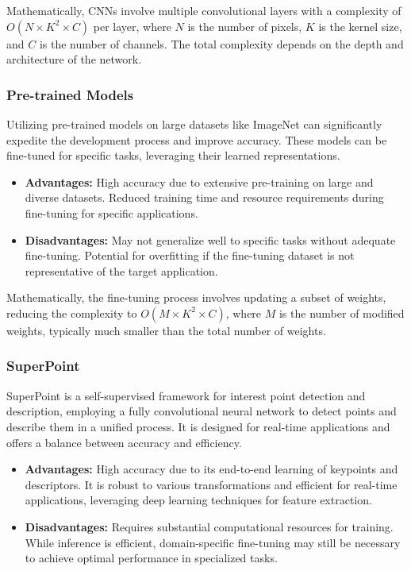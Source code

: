 Mathematically, CNNs involve multiple convolutional layers with a complexity of $O(N \times K^2 \times C)$ per layer, where $N$ is the number of pixels, $K$ is the kernel size, and $C$ is the number of channels. The total complexity depends on the depth and architecture of the network.

\subsubsection{Pre-trained Models}
Utilizing pre-trained models on large datasets like ImageNet can significantly expedite the development process and improve accuracy. These models can be fine-tuned for specific tasks, leveraging their learned representations.
\begin{itemize}
    \item \textbf{Advantages:} High accuracy due to extensive pre-training on large and diverse datasets. Reduced training time and resource requirements during fine-tuning for specific applications.
    \item \textbf{Disadvantages:} May not generalize well to specific tasks without adequate fine-tuning. Potential for overfitting if the fine-tuning dataset is not representative of the target application.
\end{itemize}

Mathematically, the fine-tuning process involves updating a subset of weights, reducing the complexity to $O(M \times K^2 \times C)$, where $M$ is the number of modified weights, typically much smaller than the total number of weights.

\subsubsection{SuperPoint}
SuperPoint is a self-supervised framework for interest point detection and description, employing a fully convolutional neural network to detect points and describe them in a unified process. It is designed for real-time applications and offers a balance between accuracy and efficiency.
\begin{itemize}
    \item \textbf{Advantages:} High accuracy due to its end-to-end learning of keypoints and descriptors. It is robust to various transformations and efficient for real-time applications, leveraging deep learning techniques for feature extraction.
    \item \textbf{Disadvantages:} Requires substantial computational resources for training. While inference is efficient, domain-specific fine-tuning may still be necessary to achieve optimal performance in specialized tasks.
\end{itemize}

